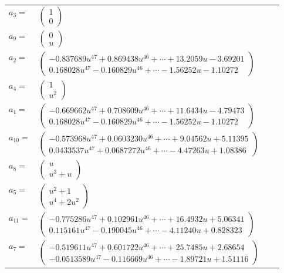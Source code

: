 \documentclass[1p]{elsarticle_modified}
\theoremstyle{definition}
\begin{document}
\begin{tabular}{m{7pt} m{180pt} m{7pt} m{180pt} }
\flushright $a_{3}=$&$\begin{pmatrix}1\\0\end{pmatrix}$ \\
\flushright $a_{9}=$&$\begin{pmatrix}0\\u\end{pmatrix}$ \\
\flushright $a_{2}=$&$\begin{pmatrix}-0.837689 u^{47}+0.869438 u^{46}+\cdots+13.2059 u-3.69201\\0.168028 u^{47}-0.160829 u^{46}+\cdots-1.56252 u-1.10272\end{pmatrix}$ \\
\flushright $a_{4}=$&$\begin{pmatrix}1\\u^2\end{pmatrix}$ \\
\flushright $a_{1}=$&$\begin{pmatrix}-0.669662 u^{47}+0.708609 u^{46}+\cdots+11.6434 u-4.79473\\0.168028 u^{47}-0.160829 u^{46}+\cdots-1.56252 u-1.10272\end{pmatrix}$ \\
\flushright $a_{10}=$&$\begin{pmatrix}-0.573968 u^{47}+0.0603230 u^{46}+\cdots+9.04562 u+5.11395\\0.0433537 u^{47}+0.0687272 u^{46}+\cdots-4.47263 u+1.08386\end{pmatrix}$ \\
\flushright $a_{8}=$&$\begin{pmatrix}u\\u^3+u\end{pmatrix}$ \\
\flushright $a_{5}=$&$\begin{pmatrix}u^2+1\\u^4+2 u^2\end{pmatrix}$ \\
\flushright $a_{11}=$&$\begin{pmatrix}-0.775286 u^{47}+0.102961 u^{46}+\cdots+16.4932 u+5.06341\\0.115161 u^{47}-0.190045 u^{46}+\cdots-4.11240 u+0.828323\end{pmatrix}$ \\
\flushright $a_{7}=$&$\begin{pmatrix}-0.519611 u^{47}+0.601722 u^{46}+\cdots+25.7485 u+2.68654\\-0.0513589 u^{47}-0.116669 u^{46}+\cdots-1.89721 u+1.51116\end{pmatrix}$ \\

\end{tabular}
\end{document}
